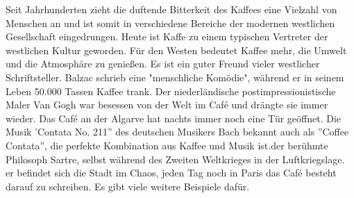 \mypar
Seit Jahrhunderten zieht die duftende Bitterkeit des Kaffees eine Vielzahl von Menschen an und ist somit in verschiedene Bereiche der modernen westlichen Gesellschaft eingedrungen.  Heute ist Kaffe zu einem typischen Vertreter der westlichen Kultur geworden. Für den Westen bedeutet Kaffee mehr, die Umwelt und die Atmosphäre zu genießen. Es ist ein guter Freund vieler westlicher Schriftsteller. Balzac schrieb eine "menschliche Komödie", während er in seinem Leben 50.000 Tassen Kaffee trank. Der niederländische postimpressionistische Maler Van Gogh war besessen von der Welt im Café und drängte sie immer wieder. Das Café an der Algarve hat nachts immer noch eine Tür geöffnet. Die Musik 'Contata No. 211'' des deutschen Musikers Bach bekannt auch als ''Coffee Contata'', die perfekte Kombination aus Kaffee und Musik ist.der berühmte Philosoph Sartre, selbst während des Zweiten Weltkrieges in der Luftkriegslage. er befindet sich die Stadt im Chaos, jeden Tag noch in Paris das Café besteht darauf zu schreiben. Es gibt viele weitere Beispiele dafür.